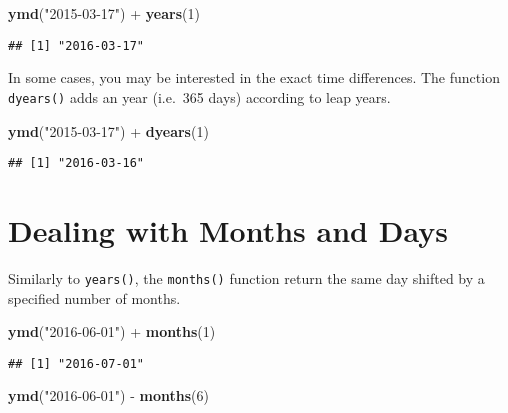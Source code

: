 \documentclass[]{book}
\newenvironment{Shaded}{\begin{snugshade}}{\end{snugshade}}
\newcommand{\KeywordTok}[1]{\textcolor[rgb]{0.13,0.29,0.53}{\textbf{{#1}}}}
\newcommand{\DecValTok}[1]{\textcolor[rgb]{0.00,0.00,0.81}{{#1}}}
\newcommand{\StringTok}[1]{\textcolor[rgb]{0.31,0.60,0.02}{{#1}}}
\newcommand{\NormalTok}[1]{{#1}}
\begin{document}
\begin{Shaded}
\begin{Highlighting}[]
\KeywordTok{ymd}\NormalTok{(}\StringTok{"2015-03-17"}\NormalTok{) +}\StringTok{ }\KeywordTok{years}\NormalTok{(}\DecValTok{1}\NormalTok{)}
\end{Highlighting}
\end{Shaded}

\begin{verbatim}
## [1] "2016-03-17"
\end{verbatim}

In some cases, you may be interested in the exact time differences. The
function \texttt{dyears()} adds an year (i.e.~365 days) according to
leap years.

\begin{Shaded}
\begin{Highlighting}[]
\KeywordTok{ymd}\NormalTok{(}\StringTok{"2015-03-17"}\NormalTok{) +}\StringTok{ }\KeywordTok{dyears}\NormalTok{(}\DecValTok{1}\NormalTok{)}
\end{Highlighting}
\end{Shaded}

\begin{verbatim}
## [1] "2016-03-16"
\end{verbatim}

\section{Dealing with Months and
Days}\label{dealing-with-months-and-days}

Similarly to \texttt{years()}, the \texttt{months()} function return the
same day shifted by a specified number of months.

\begin{Shaded}
\begin{Highlighting}[]
\KeywordTok{ymd}\NormalTok{(}\StringTok{"2016-06-01"}\NormalTok{) +}\StringTok{ }\KeywordTok{months}\NormalTok{(}\DecValTok{1}\NormalTok{)}
\end{Highlighting}
\end{Shaded}

\begin{verbatim}
## [1] "2016-07-01"
\end{verbatim}

\begin{Shaded}
\begin{Highlighting}[]
\KeywordTok{ymd}\NormalTok{(}\StringTok{"2016-06-01"}\NormalTok{) -}\StringTok{ }\KeywordTok{months}\NormalTok{(}\DecValTok{6}\NormalTok{)}
\end{Highlighting}
\end{Shaded}
\end{document}
